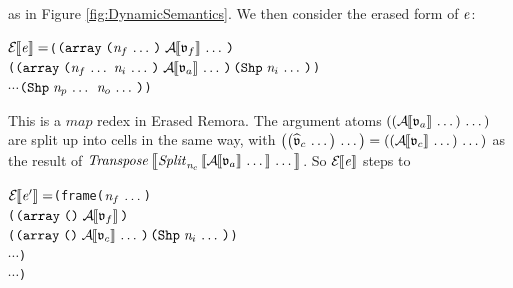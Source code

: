 \begin{sproof}
as in Figure \ref{fig:DynamicSemantics}.
We then consider the erased form of $\mathit{e}$:
\begin{alltt}
\(\EraseE{\expr} = \)(\(\erasedmapfn\)
         (\(\erasedmaparg\) \(\erasedmapcell\))
         \(\cdots\) \(\erasedliftresult\))
\end{alltt}
This is a $\mathit{map}$ redex in Erased Remora.
The argument atoms
$\left( \left( \mathcal{A}{\hskip-.25em}\left\llbracket \mathfrak{v}_a \right\rrbracket \, \ldots \, \right) \, \ldots \, \right)$
are split up into cells in the same way, with
$\left( \left( \widehat{\mathfrak{v}}_c \, \ldots \, \right) \, \ldots \, \right)
= \left( \left( \mathcal{A}{\hskip-.25em}\left\llbracket \mathfrak{v}_c \right\rrbracket \, \ldots \, \right) \, \ldots \, \right)$
as the result of
$\mathit{Transpose} \left\llbracket \mathit{Split}_{\mathit{n}_c} \left\llbracket \mathcal{A}{\hskip-.25em}\left\llbracket \mathfrak{v}_a \right\rrbracket \, \ldots \, \right\rrbracket \, \ldots \, \right\rrbracket$.
So $\mathcal{E}{\hskip-.25em}\left\llbracket \mathit{e} \right\rrbracket$ steps to
\begin{samepage}
\begin{alltt}
\(\EraseE{\expr'} = \)(frame (\(\sequence{\nat\sb{f}}\))\\
(\(\erasedmapfncell\)\\
(\(\erasedmapargcell\) \(\erasedmapcell\))\\
\(\cdots\))\\
\(\cdots\))
\end{alltt}
\end{samepage}


\end{sproof}
